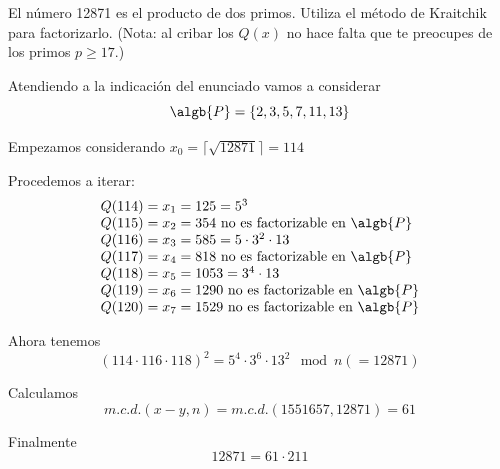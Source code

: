 \begin{problem}[7]
El número 12871 es el producto de dos
primos. Utiliza el método de Kraitchik para factorizarlo.
(Nota: al cribar los $Q(x)$ no hace falta que te preocupes de los
primos $p\ge 17$.)
\solution


Atendiendo a la indicación del enunciado vamos a considerar
\[\algb{P} = \{2,3,5,7,11,13\}\]

Empezamos considerando $x_0 = \lceil \sqrt{12871} \rceil=114$

Procedemos a iterar:
\[\begin{array}{l}
Q(114) = x_1 = 125 = 5^3\\
Q(115) = x_2 = 354 \text{ no es factorizable en } \algb{P} \\
Q(116) = x_3 = 585 = 5 \cdot 3^2 \cdot 13 \\
Q(117) = x_4 = 818 \text{ no es factorizable en } \algb{P} \\
Q(118) = x_5 = 1053 = 3^4 \cdot 13 \\
Q(119) = x_6 = 1290 \text{ no es factorizable en } \algb{P}\\
Q(120) = x_7 = 1529 \text{ no es factorizable en } \algb{P}
\end{array}\]

Ahora tenemos 
\[(114 \cdot 116 \cdot 118)^2 = 5^4 \cdot 3^6 \cdot 13^2 \mod n (=12871)\]

Calculamos
\[m.c.d.(x-y,n) = m.c.d.(1551657,12871)= 61 \]

Finalmente
\[12871 = 61 \cdot 211 \]
\end{problem}


